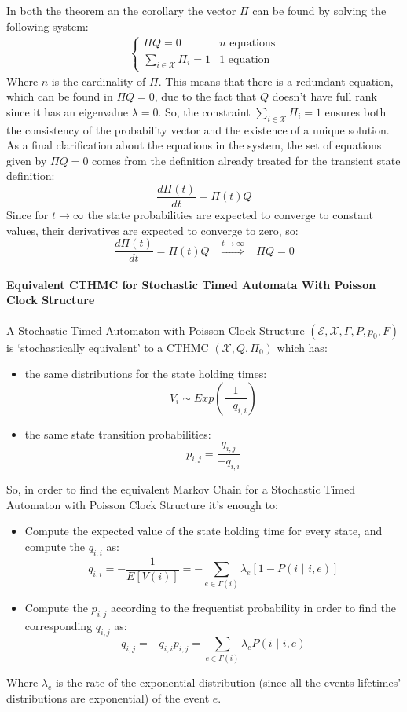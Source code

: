 \documentclass[12pt,a4paper]{article}
\begin{document}
\bigskip
\noindent
In both the theorem an the corollary the vector $\Pi$ can be found by solving the following system:
$$
\begin{matrix}
\begin{cases}
\Pi Q=0 & n \textrm{ equations}\\
\underset{i\in\mathcal{X}}{\sum{}}{\Pi_i=1} & 1 \textrm{ equation}
\end{cases}
\end{matrix}
$$
Where $n$ is the cardinality of $\Pi$. This means that there is a redundant equation, which can be found in $\Pi Q=0$, due to the fact that $Q$ doesn't have full rank since it has an eigenvalue $\lambda =0$. So, the constraint $\sum_{i\in\mathcal{X}}{\Pi_i=1}$ ensures both the consistency of the probability vector and the existence of a unique solution.
As a final clarification about the equations in the system, the set of equations given by $\Pi Q=0$ comes from the definition already treated for the transient state definition:
$$
\frac{d\Pi(t)}{dt}=\Pi(t)Q
$$ 
Since for $t\rightarrow\infty$ the state probabilities are expected to converge to constant values, their derivatives are expected to converge to zero, so:
$$
\frac{d\Pi(t)}{dt}=\Pi(t)Q \hspace{10pt} \overset{t\rightarrow\infty}{\Rightarrow}\hspace{10pt} \Pi Q=0
$$
\newpage
\paragraph{Equivalent CTHMC for Stochastic Timed Automata With Poisson Clock Structure}

\noindent A Stochastic Timed Automaton with Poisson Clock Structure $(\mathcal{E},\mathcal{X},\Gamma,P,p_0,F)$
is `stochastically equivalent' to a CTHMC $(\mathcal{X},Q,\Pi_0)$ which has:
\begin{itemize}
\item the same distributions for the state holding times:
$$
V_i \sim Exp\left(\frac{1}{-q_{i,i}}\right)
$$
\item the same state transition probabilities:
$$
p_{i,j}=\frac{q_{i,j}}{-q_{i,i}}
$$
\end{itemize}  
So, in order to find the equivalent Markov Chain for a Stochastic Timed Automaton with Poisson Clock Structure it's enough to:
\begin{itemize}
\item Compute the expected value of the state holding time for every state, and compute the $q_{i,i}$ as:
$$
q_{i,i}=-\frac{1}{E[V(i)]}=-\sum_{e\in\Gamma(i)}{\lambda_e\left[1-P(i\hspace{4pt}|\hspace{4pt}i,e)\right]}
$$
\item Compute the $p_{i,j}$ according to the frequentist probability in order to find the corresponding $q_{i,j}$ as:
$$
q_{i,j}=-q_{i,i}p_{i,j}=\sum_{e\in\Gamma(i)}{\lambda_e P(i\hspace{4pt}|\hspace{4pt}i,e)}
$$
\end{itemize}
Where $\lambda_e$ is the rate of the exponential distribution (since all the events lifetimes' distributions are exponential) of the event $e$.
\newpage
\end{document}
